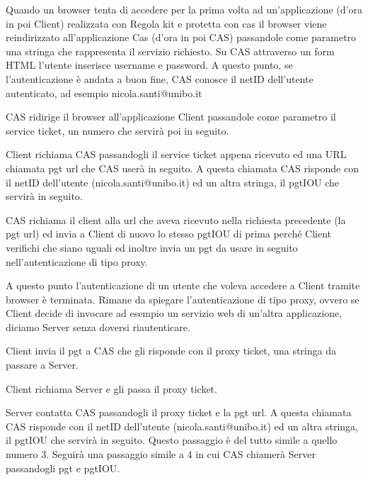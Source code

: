 \begin{enumerate*}
\item Quando un browser tenta di accedere per la prima volta ad un'applicazione (d'ora in poi Client) realizzata con Regola kit e protetta con cas il browser viene reindirizzato all'applicazione Cas (d'ora in poi CAS) passandole come parametro una stringa che rappresenta il servizio richiesto. Su CAS attraverso un form HTML l'utente inserisce username e password. A questo punto, se l'autenticazione è andata a buon fine, CAS conosce il netID dell'utente autenticato, ad esempio nicola.santi@unibo.it

\item  CAS ridirige il browser all'applicazione Client passandole come parametro il service ticket, un numero che servirà poi in seguito.

\item  Client richiama CAS passandogli il service ticket appena ricevuto ed una URL chiamata pgt url che CAS userà in seguito. A questa chiamata CAS risponde con il netID dell'utente (nicola.santi@unibo.it) ed un altra stringa, il pgtIOU che servirà in seguito.

\item  CAS richiama il client alla url che aveva ricevuto nella richiesta precedente (la pgt url) ed invia a Client di nuovo lo stesso pgtIOU di prima perché Client verifichi che siano uguali ed inoltre invia un pgt da usare in seguito nell'autenticazione di tipo proxy.

A questo punto l'autenticazione di un utente che voleva accedere a Client tramite browser è terminata. Rimane da spiegare l'autenticazione di tipo proxy, ovvero se Client decide di invocare ad esempio un servizio web di un'altra applicazione, diciamo Server senza doversi riautenticare.

\item Client invia il pgt a CAS che gli risponde con il proxy ticket, una stringa da passare a Server.

\item Client richiama Server e gli passa il proxy ticket.

\item Server contatta CAS passandogli il proxy ticket e la pgt url. A questa chiamata CAS risponde con il netID dell'utente (nicola.santi@unibo.it) ed un altra stringa, il pgtIOU che servirà in seguito. Questo passaggio è del tutto simile a quello numero 3. Seguirà una passaggio simile a 4 in cui CAS chiamerà Server passandogli pgt e pgtIOU.
\end{enumerate*}

